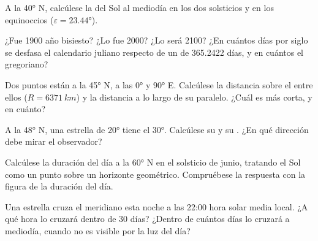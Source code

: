 \begin{exercise}[$\star$]\label{exo:b1:spherical-astronomy:3}
A la  \ang{40} N, calcúlese la  del Sol al mediodía en los dos
solsticios y en los equinoccios ($\varepsilon = \ang{23.44}$).
\end{exercise}

\begin{exercise}[$\star$]\label{exo:b1:spherical-astronomy:4}
¿Fue 1900 año bisiesto? ¿Lo fue 2000? ¿Lo será 2100? ¿En cuántos días por siglo
se desfasa el calendario juliano respecto de un  de 365.2422 días, y
en cuántos el gregoriano?
\end{exercise}

\begin{exercise}[$\star\star$]\label{exo:b1:spherical-astronomy:5}
Dos puntos están a la  \ang{45} N, a las  \ang{0} y \ang{90} E.
Calcúlese la distancia sobre el  entre ellos ($R = \qty{6371}{km}$)
y la distancia a lo largo de su paralelo. ¿Cuál es más corta, y en cuánto?
\end{exercise}

\begin{exercise}[$\star\star$]\label{exo:b1:spherical-astronomy:6}
A la  \ang{48} N, una estrella de  \ang{20} tiene el  \ang{30}. Calcúlese su  y su . ¿En qué dirección debe mirar
el observador?
\end{exercise}

\begin{exercise}[$\star\star$]\label{exo:b1:spherical-astronomy:7}
Calcúlese la duración del día a la  \ang{60} N en el solsticio de junio,
tratando el Sol como un punto sobre un horizonte geométrico. Compruébese la
respuesta con la figura de la duración del día.
\end{exercise}

\begin{exercise}[$\star\star$]\label{exo:b1:spherical-astronomy:8}
Una estrella cruza el meridiano esta noche a las 22:00 hora solar media local.
¿A qué hora lo cruzará dentro de 30 días? ¿Dentro de cuántos días lo cruzará a
mediodía, cuando no es visible por la luz del día?
\end{exercise}

